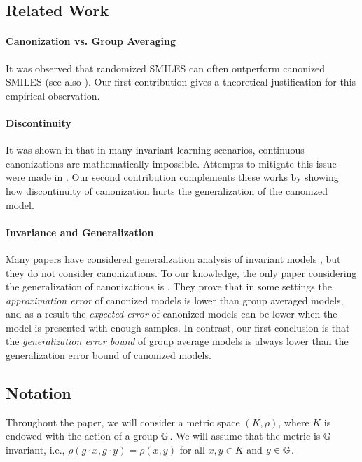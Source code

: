 \documentclass{article}
\begin{document}
\subsection{Related Work} 
\paragraph{Canonization vs. Group Averaging} It was observed that randomized SMILES can often outperform canonized SMILES \cite{ArusPous2019,Bjerrum2017SMILESEA} (see also \cite{ito2026random}). Our first contribution gives a theoretical justification for this empirical observation.

\paragraph{Discontinuity} It was shown in \cite{dym2024equivariant,pmlr-v235-baker24a} that in many invariant learning scenarios, continuous canonizations are mathematically impossible. Attempts to mitigate this issue were made in  \cite{tahmasebi2025regularity,lin2026adaptive}. Our second contribution complements these works by showing how discontinuity of canonization hurts the generalization of the canonized model.  

\paragraph{Invariance and Generalization} Many papers have considered generalization analysis of invariant models \cite{vasileiou2025survey,petrache2023approximationgeneralization,maskey2025generalization, franks2024weisfeiler}, but they do not consider canonizations. To our knowledge, the only paper considering the generalization of canonizations is \cite{tahmasebi2025generalization}. They prove that in some settings the \emph{approximation error} of canonized models is lower than group averaged models, and as a result the \emph{expected error} of canonized models can be lower when the model is presented with enough samples. In contrast, our first conclusion is that the \emph{generalization error bound} of group average models is always lower than the generalization error bound of canonized models.

\subsection{Notation}
Throughout the paper, we will consider a metric space $(K,\rho) $, where $K$ is endowed with the action of a group $\mathbb{G}$. We will assume that the metric is $\mathbb{G}$ invariant, i.e., $ \rho(g\cdot x, g \cdot y)=\rho(x,y)$ for all $x,y\in K$ and $g \in \mathbb{G} $.  
\end{document}
